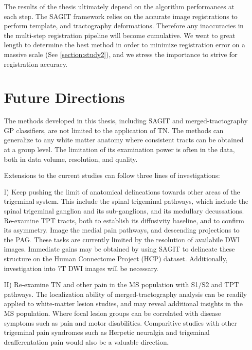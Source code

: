 The results of the thesis ultimately depend on the algorithm performances at each step. The SAGIT framework relies on the accurate image registrations to perform template, and tractography deformations. Therefore any inaccuracies in the multi-step registration pipeline will become cumulative. We went to great length to determine the best method in order to minimize registration error on a massive scale (See \ref{section:study2}), and we stress the importance to strive for registration accuracy. 



\section{Future Directions}

The methods developed in this thesis, including SAGIT and merged-tractography GP classifiers,  are not limited to the application of TN. The methods can generalize to any white matter anatomy where consistent tracts can be obtained at a group level. The limitation of its examination power is often in the data, both in data volume, resolution, and quality.

Extensions to the current studies can follow three lines of investigations:

I) Keep pushing the limit of anatomical delineations towards other areas of the trigeminal system. This include the spinal trigeminal pathways, which include the spinal trigeminal ganglion and its sub-ganglions, and its medullary decussations. Re-examine TPT tracts, both to establish its diffusivity baseline, and to confirm its asymmetry. Image the medial pain pathways, and descending projections to the PAG. These tasks are currently limited by the resolution of availabile DWI images. Immediate gains may be obtained by using SAGIT to delineate these structure on the Human Connectome Project (HCP) dataset. Additionally, investigation into 7T DWI images will be necessary. 

II) Re-examine TN and other pain in the MS population with S1/S2 and TPT pathways. The localization ability of merged-tractography analysis can be readily applied to white-matter lesion studies, and may reveal additional insights in the MS population. Where focal lesion groups can be correlated with disease symptoms such as pain and motor disabilities. Comparitive studies with other trigeminal pain syndromes such as Herpetic neuralgia and trigeminal deafferentation pain would also be a valuable direction.

